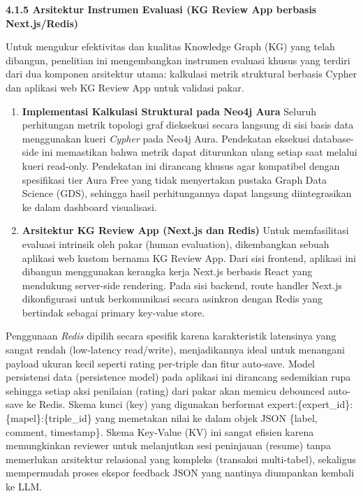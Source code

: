 \documentclass[
]{article}
\begin{document}
\textbf{4.1.5 Arsitektur Instrumen Evaluasi (KG Review App berbasis
Next.js/Redis)}

Untuk mengukur efektivitas dan kualitas Knowledge Graph (KG) yang telah
dibangun, penelitian ini mengembangkan instrumen evaluasi khusus yang
terdiri dari dua komponen arsitektur utama: kalkulasi metrik struktural
berbasis Cypher dan aplikasi web KG Review App untuk validasi pakar.

\begin{enumerate}
\def\labelenumi{\arabic{enumi}.}
\item
  \textbf{Implementasi Kalkulasi Struktural pada Neo4j Aura} Seluruh
  perhitungan metrik topologi graf dieksekusi secara langsung di sisi
  basis data menggunakan kueri \emph{Cypher} pada Neo4j Aura. Pendekatan
  eksekusi database-side ini memastikan bahwa metrik dapat diturunkan
  ulang setiap saat melalui kueri read-only. Pendekatan ini dirancang
  khusus agar kompatibel dengan spesifikasi tier Aura Free yang tidak
  menyertakan pustaka Graph Data Science (GDS), sehingga hasil
  perhitungannya dapat langsung diintegrasikan ke dalam dashboard
  visualisasi.
\item
  \textbf{Arsitektur KG Review App (Next.js dan Redis)} Untuk
  memfasilitasi evaluasi intrinsik oleh pakar (human evaluation),
  dikembangkan sebuah aplikasi web kustom bernama KG Review App. Dari
  sisi frontend, aplikasi ini dibangun menggunakan kerangka kerja
  Next.js berbasis React yang mendukung server-side rendering. Pada sisi
  backend, route handler Next.js dikonfigurasi untuk berkomunikasi
  secara asinkron dengan Redis yang bertindak sebagai primary key-value
  store.
\end{enumerate}

Penggunaan \emph{Redis} dipilih secara spesifik karena karakteristik
latensinya yang sangat rendah (low-latency read/write), menjadikannya
ideal untuk menangani payload ukuran kecil seperti rating per-triple dan
fitur auto-save. Model persistensi data (persistence model) pada
aplikasi ini dirancang sedemikian rupa sehingga setiap aksi penilaian
(rating) dari pakar akan memicu debounced auto-save ke Redis. Skema
kunci (key) yang digunakan berformat
expert:\{expert\_id\}:\{mapel\}:\{triple\_id\} yang memetakan nilai ke
dalam objek JSON \{label, comment, timestamp\}. Skema Key-Value (KV) ini
sangat efisien karena memungkinkan reviewer untuk melanjutkan sesi
peninjauan (resume) tanpa memerlukan arsitektur relasional yang kompleks
(transaksi multi-tabel), sekaligus mempermudah proses ekspor feedback
JSON yang nantinya diumpankan kembali ke LLM.
\end{document}
